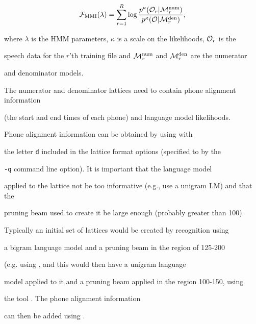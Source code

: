 \newcommand{\calO}{ {\cal O} }


\newcommand{\calM}{ {\cal M} }





\begin{equation}


    {\cal F}_\MMI(\lambda) = \sum_{r=1}^R \log \frac {  p^\kappa(\calO_r | \calM^\num_r) } { p^\kappa(\calO | \calM^\den_r) },


  \label{eq:mmimodels}


\end{equation}


where $\lambda$ is the HMM parameters,  $\kappa$ is a scale on the likelihoods, $\calO_r$ is the


speech data for the $r$'th training file and $\calM^\num_r$ and $\calM^\den_r$ are the numerator


and denominator models.  





The numerator and denominator lattices need to contain phone alignment information


(the start and end times of each phone) and language model likelihoods.


Phone alignment information can be obtained by using  with


the letter \texttt{d} included in the lattice format options (specified to  by the


\texttt{-q} command line option).  It is important that the language model


applied to the lattice not be too informative (e.g., use a unigram LM) and that the


pruning beam used to create it be large enough (probably greater than 100).


Typically an initial set of lattices would be created by recognition using


a bigram language model and a pruning beam in the region of 125-200


(e.g. using , and this would then have a unigram language


model applied to it and a pruning beam applied in the region 100-150, using


the tool .   The phone alignment information


can then be added using .





